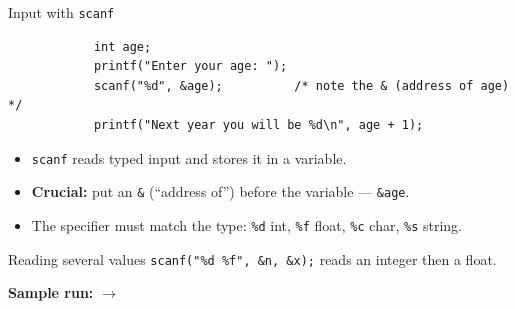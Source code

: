 \documentclass[aspectratio=169]{beamer}
\begin{document}
	\begin{frame}[fragile]{Input with \texttt{scanf}}
		\begin{lstlisting}
			int age;
			printf("Enter your age: ");
			scanf("%d", &age);          /* note the & (address of age) */
			printf("Next year you will be %d\n", age + 1);
		\end{lstlisting}
		\begin{itemize}\small
			\item \texttt{scanf} reads typed input and stores it in a variable.
			\item \textbf{Crucial:} put an \texttt{\&} (``address of'') before the variable --- \texttt{\&age}.
			\item The specifier must match the type: \texttt{\%d} int, \texttt{\%f} float, \texttt{\%c} char, \texttt{\%s} string.
		\end{itemize}
		\begin{block}{Reading several values}
			\small \texttt{scanf("\%d \%f", \&n, \&x);} reads an integer then a float.
		\end{block}
		\centering\footnotesize\textbf{Sample run:}\;  $\rightarrow$ 
	\end{frame}
	
\end{document}
